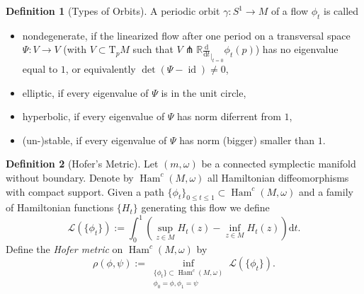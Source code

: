 \documentclass[a4paper]{article}
\newcommand{\RR}{\mathbb{R}}
\newcommand{\mcL}{\mathcal L}
\newcommand{\dd}{\mathrm{d}}
\newcommand{\lra}{\longrightarrow}
\newcommand{\ddt}{\frac{\dd}{\dd t}_{|_{t=0}}}
\newcommand{\id}{\operatorname{id}}
\newcommand{\ts}{\mathrm{T}}
\newcommand{\Ham}{\operatorname{Ham}}
\theoremstyle{definition}
\theoremstyle{definition}
\newtheorem{definition}{Definition}
\theoremstyle{remark}
\theoremstyle{remark}
\theoremstyle{remark}
\begin{document}
\begin{definition}[Types of Orbits]
A periodic orbit $\gamma:S^1\lra M$ of a flow $\phi_t$ is called
\begin{itemize}
  \item nondegenerate, if the linearized flow after one period on a transversal space $\Psi:V\lra V$ (with $V\subset \ts_p M$ such that $V\pitchfork \RR\ddt\phi_t(p)$) has no eigenvalue equal to $1$, or equivalently $\det(\Psi-\id)\neq 0$,
  \item elliptic, if every eigenvalue of $\Psi$ is in the unit circle,
  \item hyperbolic, if every eigenvalue of $\Psi$ has norm diferrent from $1$,
  \item (un-)stable, if every eigenvalue of $\Psi$ has norm (bigger) smaller than $1$.
\end{itemize}
\end{definition}

\begin{definition}[Hofer's Metric]
  Let $(m,\omega)$ be a connected symplectic manifold without boundary. Denote by $\Ham^c(M,\omega)$ all Hamiltonian diffeomorphisms with compact support. Given a path $\{\phi_t\}_{0\leq t\leq 1}\subset\Ham^c(M,\omega)$ and a family of Hamiltonian functions $\{H_t\}$ generating this flow we define
  \begin{equation*}
    \mcL(\{\phi_t\}):=\int_0^1\left(\sup_{z\in M}H_t(z)-\inf_{z\in M} H_t(z)\right)\dd t.
  \end{equation*}
  Define the \emph{Hofer metric} on $\Ham^c(M,\omega)$ by
  \begin{equation*}
    \rho(\phi,\psi):=\inf_{\substack{\{\phi_t\}\subset\Ham^c(M,\omega)\\ \phi_0=\phi, \phi_1=\psi}}\mcL(\{\phi_t\}).
  \end{equation*}
\end{definition}
\end{document}
